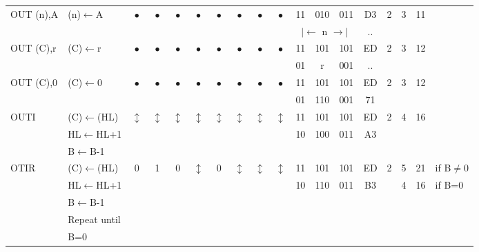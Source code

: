 \documentclass[oneside,a4paper]{book}
\begin{document}
{\begin{tabular}{llcccccccccccccccl}
		OUT (n),A\instrt & 
			(n)$\leftarrow$A &
			$\bullet$ & 
				$\bullet$ & 
				$\bullet$ & 
				$\bullet$ & 
				$\bullet$ & 
				$\bullet$ & 
				$\bullet$ & 
				$\bullet$ & 
			11 & 010 & 011 & 
			D3 & 2 & 
			3 & 11 & \\
			\multicolumn{10}{c}{} & \multicolumn{3}{c}{$|\longleftarrow$ n $\longrightarrow|$} & .. & \instrb \\

		OUT (C),r\instrt & 
			(C)$\leftarrow$r &
			$\bullet$ & 
				$\bullet$ & 
				$\bullet$ & 
				$\bullet$ & 
				$\bullet$ & 
				$\bullet$ & 
				$\bullet$ & 
				$\bullet$ & 
			11 & 101 & 101 & 
			ED & 2 & 
			3 & 12 & \\
			\multicolumn{10}{c}{} & 01 & r & 001 & .. & \instrb \\

		OUT (C),0\instrt & 
			(C)$\leftarrow$0 &
			$\bullet$ & 
				$\bullet$ & 
				$\bullet$ & 
				$\bullet$ & 
				$\bullet$ & 
				$\bullet$ & 
				$\bullet$ & 
				$\bullet$ & 
			11 & 101 & 101 & 
			ED & 2 & 
			3 & 12 & \\
			\multicolumn{10}{c}{} & 01 & 110 & 001 & 71 & \instrb \\

		OUTI\instrt & 
			(C)$\leftarrow$(HL) & 
			$\updownarrow$\footnotemark[1] & 
				$\updownarrow$\footnotemark[1] & 
				$\updownarrow$\footnotemark[1] & 
				$\updownarrow$\footnotemark[3] & 
				$\updownarrow$\footnotemark[1] & 
				$\updownarrow$\footnotemark[3] & 
				$\updownarrow$\footnotemark[2] & 
				$\updownarrow$\footnotemark[3] & 
			11 & 101 & 101 & 
			ED & 2 & 
			4 & 16 & \\
			& HL$\leftarrow$HL+1 & \multicolumn{8}{c}{} & 10 & 100 & 011 & A3 & \\
			& B$\leftarrow$B-1 & \instrb \\

		OTIR\instrt & 
			(C)$\leftarrow$(HL) & 
			0 & 
				1 & 
				0 & 
				$\updownarrow$\footnotemark[3] & 
				0 & 
				$\updownarrow$ & 
				$\updownarrow$\footnotemark[2] & 
				$\updownarrow$\footnotemark[3] & 
			11 & 101 & 101 & 
			ED & 2 & 
			5 & 21 & {if B$\not=$0} \\
			& HL$\leftarrow$HL+1 & \multicolumn{8}{c}{} & 10 & 110 & 011 & B3 & & 4 & 16 & {if B=0} \\
			& B$\leftarrow$B-1 \\
			& Repeat until \\
			& B=0 & \instrb \\


\end{tabular}}
\end{document}
